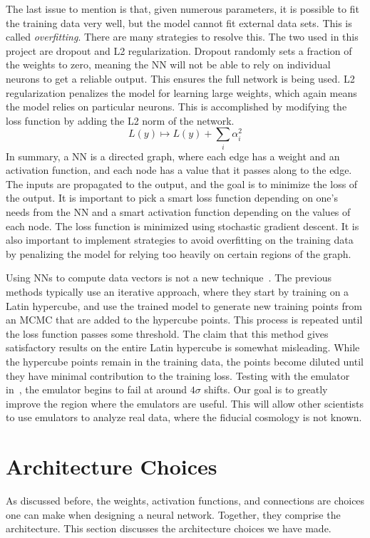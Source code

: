 The last issue to mention is that, given numerous parameters, it is possible to fit the training data very well, but the model cannot fit external data sets. This is called \textit{overfitting}. There are many strategies to resolve this. The two used in this project are dropout and L2 regularization. Dropout randomly sets a fraction of the weights to zero, meaning the NN will not be able to rely on individual neurons to get a reliable output. This ensures the full network is being used. L2 regularization penalizes the model for learning large weights, which again means the model relies on particular neurons. This is accomplished by modifying the loss function by adding the L2 norm of the network.
\begin{equation}
	L(y) \mapsto L(y)+\sum_i \alpha_i^2
\end{equation}
In summary, a NN is a directed graph, where each edge has a weight and an activation function, and each node has a value that it passes along to the edge. The inputs are propagated to the output, and the goal is to minimize the loss of the output. It is important to pick a smart loss function depending on one's needs from the NN and a smart activation function depending on the values of each node. The loss function is minimized using stochastic gradient descent. It is also important to implement strategies to avoid overfitting on the training data by penalizing the model for relying too heavily on certain regions of the graph.

Using NNs to compute data vectors is not a new technique~\cite{boruah_accelerating_2022,to_linna_2023}. The previous methods typically use an iterative approach, where they start by training on a Latin hypercube, and use the trained model to generate new training points from an MCMC that are added to the hypercube points. This process is repeated until the loss function passes some threshold. The claim that this method gives satisfactory results on the entire Latin hypercube is somewhat misleading. While the hypercube points remain in the training data, the points become diluted until they have minimal contribution to the training loss. Testing with the emulator in~\cite{boruah_accelerating_2022}, the emulator begins to fail at around $4\sigma$ shifts. Our goal is to greatly improve the region where the emulators are useful. This will allow other scientists to use emulators to analyze real data, where the fiducial cosmology is not known.

\section{Architecture Choices}
As discussed before, the weights, activation functions, and connections are choices one can make when designing a neural network. Together, they comprise the architecture. This section discusses the architecture choices we have made.

